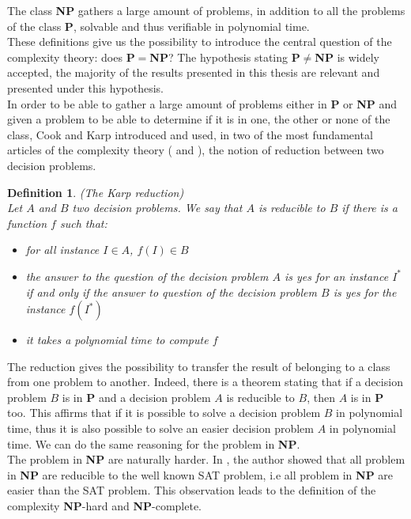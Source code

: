 \documentclass[a4paper]{book}
\newtheorem{definition}{Definition}
\begin{document}
The class \textbf{NP} gathers a large amount of problems, in addition to all the problems of the class \textbf{P}, solvable and thus verifiable in polynomial time. \\
These definitions give us the possibility to introduce the central question of the complexity theory: does \textbf{P}$=$\textbf{NP}? The hypothesis stating \textbf{P}$\ne$\textbf{NP} is widely accepted, the majority of the results presented in this thesis are relevant and presented under this hypothesis. \\
In order to be able to gather a large amount of problems either in \textbf{P} or \textbf{NP} and given a problem to be able to determine if it is in one, the other or none of the class, Cook and Karp introduced and used, in two of the most fundamental articles of the complexity theory (\cite{Cook71} and \cite{Karp72}), the notion of reduction between two decision problems.

\begin{definition}{\emph{(The Karp reduction)}}\\
Let $A$ and $B$ two decision problems. We say that $A$ is reducible to $B$ if there is a function $f$ such that:
\begin{itemize}
    \item for all instance $I \in A$, $f(I)\in B$
    \item the answer to the question of the decision problem $A$ is yes for an instance $I^*$ if and only if the answer to question of the decision problem $B$ is yes for the instance $f(I^*)$
    \item it takes a polynomial time to compute $f$ 
\end{itemize}
\end{definition}

The reduction gives the possibility to transfer the result of belonging to a class from one problem to another. Indeed, there is a theorem stating that if a decision problem $B$ is in \textbf{P} and a decision problem $A$ is reducible to $B$, then $A$ is in \textbf{P} too. This affirms that if it is possible to solve a decision problem $B$ in polynomial time, thus it is also possible to solve an easier decision problem $A$ in polynomial time. We can do the same reasoning for the problem in \textbf{NP}. \\
The problem in \textbf{NP} are naturally harder. In \cite{Cook71}, the author showed that all problem in \textbf{NP} are reducible to the well known {\sc SAT} problem, i.e all problem in \textbf{NP} are easier than the {\sc SAT} problem. This observation leads to the definition of the complexity \textbf{NP}-hard and \textbf{NP}-complete.
\end{document}
